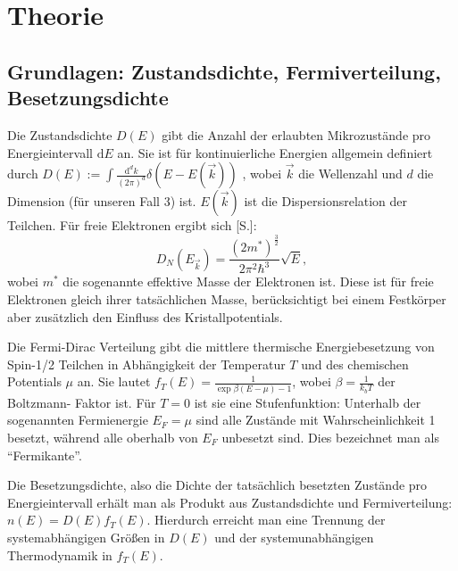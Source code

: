 \documentclass[twoside,        %
               BCOR12mm,       %
               english,ngerman, %
               fleqn,headsepline=false,footsepline=false
              ]{Vorlage/MFPREPORT}
\renewcommand{\d}{\ensuremath{\mathrm{d}}} %
\begin{document}
\section{Theorie}
\label{sec:theorie}
\subsection{Grundlagen: Zustandsdichte, Fermiverteilung, Besetzungsdichte}
Die Zustandsdichte $D(E)$ gibt die Anzahl der erlaubten Mikrozustände pro
Energieintervall $\d E$ an. Sie ist für kontinuierliche Energien allgemein
definiert durch $D(E):=\int \frac{\d^d k}{(2
\pi)^d}\delta\left(E-E(\vec{k})\right)$ \cite{hunklingerfk},
wobei $\vec k$ die Wellenzahl und $d$ die Dimension (für unseren Fall 3) ist.
$E(\vec k)$ ist die Dispersionsrelation der Teilchen.
Für freie Elektronen ergibt sich [S.]\cite{hunklingerfk}:
\begin{equation}
    \label{eq:freielek}
   D_N(E_{\vec{k}})=\frac{\left(2m^*\right)^\frac{3}{2}}{2\pi ^2\hbar ^3}\sqrt{E}, 
\end{equation}
wobei $m^*$ die sogenannte effektive Masse der Elektronen ist. Diese ist für freie
Elektronen gleich ihrer tatsächlichen Masse, berücksichtigt bei einem
Festkörper aber zusätzlich den Einfluss des Kristallpotentials.

Die Fermi-Dirac Verteilung gibt die mittlere thermische Energiebesetzung von Spin-1/2
Teilchen in Abhängigkeit der Temperatur $T$ und des chemischen Potentials $\mu$
an. Sie lautet $f_T(E)=\frac{1}{\exp{\beta(E-\mu)-1}}$, wobei
$\beta=\frac{1}{k_b T}$ der Boltzmann- Faktor ist. Für $T=0$ ist sie eine
Stufenfunktion: Unterhalb der sogenannten Fermienergie $E_F=\mu$ sind alle
Zustände mit Wahrscheinlichkeit 1 besetzt, während alle oberhalb von $E_F$
unbesetzt sind. Dies bezeichnet man als ``Fermikante''.

Die Besetzungsdichte, also die Dichte der tatsächlich besetzten Zustände pro
Energieintervall erhält man als
Produkt aus Zustandsdichte und Fermiverteilung: $n(E)=D(E)f_T(E)$. Hierdurch
erreicht man eine Trennung der systemabhängigen Größen in $D(E)$ und der
systemunabhängigen Thermodynamik in $f_T(E)$.
\end{document}
